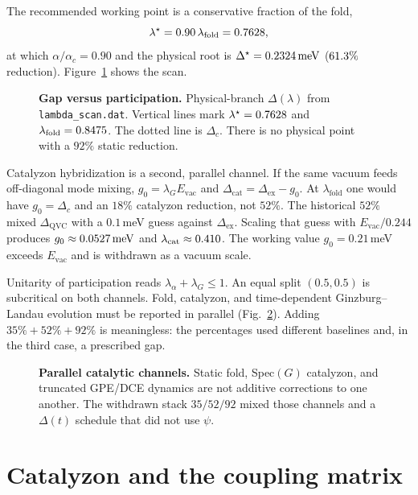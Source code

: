 \documentclass[11pt,letterpaper]{article}
\begin{document}
The recommended working point is a conservative fraction of the fold,
\begin{equation}
\lambda^\star=0.90\,\lambda_{\mathrm{fold}}=0.7628,
\end{equation}
at which $\alpha/\alpha_c=0.90$ and the physical root is $\Delta^\star=0.2324\,\mathrm{meV}$ ($61.3\%$ reduction). Figure~\ref{fig:lambda} shows the scan.

\begin{figure}[H]
\centering

\caption{\textbf{Gap versus participation.} Physical-branch $\Delta(\lambda)$ from \texttt{lambda\_scan.dat}. Vertical lines mark $\lambda^\star=0.7628$ and $\lambda_{\mathrm{fold}}=0.8475$. The dotted line is $\Delta_c$. There is no physical point with a $92\%$ static reduction.}
\label{fig:lambda}
\end{figure}

Catalyzon hybridization is a second, parallel channel. If the same vacuum feeds off-diagonal mode mixing, $g_0=\lambda_G E_{\mathrm{vac}}$ and $\Delta_{\mathrm{cat}}=\Delta_{\mathrm{ex}}-g_0$. At $\lambda_{\mathrm{fold}}$ one would have $g_0=\Delta_c$ and an $18\%$ catalyzon reduction, not $52\%$. The historical $52\%$ mixed $\Delta_{\mathrm{QVC}}$ with a $0.1$\,meV guess against $\Delta_{\mathrm{ex}}$. Scaling that guess with $E_{\mathrm{vac}}/0.244$ produces $g_0\approx0.0527\,\mathrm{meV}$ and $\lambda_{\mathrm{cat}}\approx0.410$. The working value $g_0=0.21$\,meV exceeds $E_{\mathrm{vac}}$ and is withdrawn as a vacuum scale.

Unitarity of participation reads $\lambda_\alpha+\lambda_G\le 1$. An equal split $(0.5,0.5)$ is subcritical on both channels. Fold, catalyzon, and time-dependent Ginzburg--Landau evolution must be reported in parallel (Fig.~\ref{fig:channels}). Adding $35\%+52\%+92\%$ is meaningless: the percentages used different baselines and, in the third case, a prescribed gap.

\begin{figure}[H]
\centering

\caption{\textbf{Parallel catalytic channels.} Static fold, Spec$(G)$ catalyzon, and truncated GPE/DCE dynamics are not additive corrections to one another. The withdrawn stack $35/52/92$ mixed those channels and a $\Delta(t)$ schedule that did not use $\psi$.}
\label{fig:channels}
\end{figure}

\section{Catalyzon and the coupling matrix}
\label{sec:catalyzon}
\end{document}
